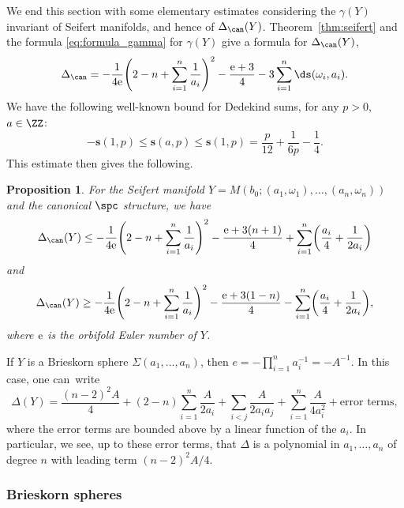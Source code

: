 \documentclass[10pt,a4paper]{amsart}
\newcounter{theorem}
\newtheorem{Proposition}[Theorem]{Proposition}
 { \theoremstyle{definition}
\newtheorem{Definition}[Theorem]{Definition}
\newtheorem{Note}[Theorem]{Note}
\newtheorem{Example}[Theorem]{Example}
\newtheorem{Remark}[Theorem]{Remark}
\newtheorem{Question}[theorem]{Question}
}
\begin{document}
We end this section with some elementary estimates considering the $\gamma(Y)$ invariant of Seifert manifolds, and hence of $\Delta_{\can}(Y)$. Theorem~\ref{thm:seifert} and the formula \eqref{eq:formula_gamma} for $\gamma(Y)$ give a formula for $\Delta_{\can}(Y)$,
 \begin{equation}\label{eq:formula_delta}
 \Delta_{\can} = - \frac{1}{4{\rm e}}\Biggl(2-n + \sum_{i=1}^n \frac{1}{a_i}\Biggr)^2 - \frac{{\rm e}+3}{4} - 3 \sum_{i=1}^n \ds(\omega_i, a_i).
 \end{equation}
We have the following well-known bound for Dedekind sums, for any $p>0$, $a \in \ZZ$:
\begin{equation*}%
 -\mathbf{s}(1, p) \leq \mathbf{s}(a, p) \leq \mathbf{s}(1, p) = \frac{p}{12} + \frac{1}{6p} - \frac{1}{4}.
\end{equation*}
This estimate then gives the following.

\begin{Proposition}\label{lower-bound-delta-general-seifert}
 For the Seifert manifold $Y = M(b_0;(a_1, \omega_1), \dots, (a_n, \omega_n))$ and the canonical $\spc$ structure, we have
 \[
 \Delta_{\can}(Y) \leq - \frac{1}{4{\rm e}}\Biggl(2-n + \sum_{i=1}^n \frac{1}{a_i}\Biggr)^2 - \frac{{\rm e}+3(n+1)}{4} + \sum_{i=1}^n \biggl( \frac{a_i}{4} + \frac{1}{2a_i}\biggr)
 \]
 and
 \[
 \Delta_{\can}(Y) \geq -\frac{1}{4{\rm e}}\Biggl(2-n + \sum_{i=1}^n \frac{1}{a_i}\Biggr)^2 -\frac{{\rm e}+3(1-n)}{4} - \sum_{i=1}^n \biggl(\frac{a_i}{4} + \frac{1}{2a_i}\biggr),
 \]
 where ${\rm e}$ is the orbifold Euler number of $Y$.
\end{Proposition}

If $Y$ is a Brieskorn sphere $\Sigma(a_1, \dots, a_n)$, then $e = -\prod_{i=1}^n a_i^{-1}=-A^{-1}$. In this case, one can~write
\begin{equation*}
 \Delta(Y) = \frac{(n-2)^2A}{4} + (2-n) \sum_{i=1}^n \frac{A}{2a_i} + \sum_{i < j}\frac{A}{2a_ia_j} + \sum_{i=1}^n \frac{A}{4a_i^2} + \text{error terms},
\end{equation*}
where the error terms are bounded above by a linear function of the $a_i$. In particular, we see, up to these error terms, that $\Delta$ is a polynomial in $a_1, \dots, a_n$ of degree $n$ with leading term $(n-2)^2A/4$.

\subsubsection{Brieskorn spheres}
\end{document}
